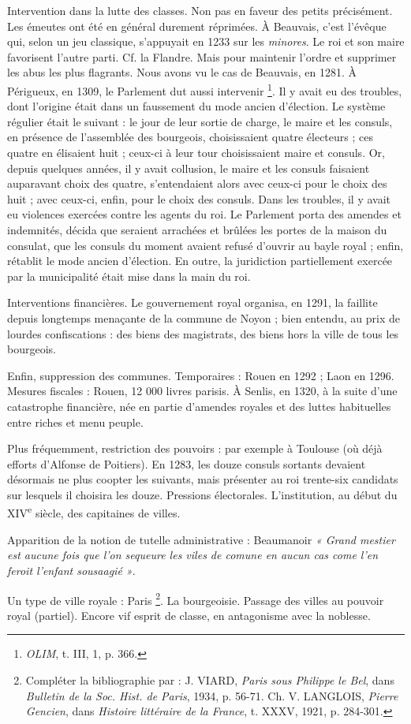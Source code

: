 \documentclass[french,twoside]{book} %
\begin{document}
Intervention dans la lutte des classes. Non pas en faveur des petits précisément. Les émeutes ont été en général durement répri­mées. À Beauvais, c’est l’évêque qui, selon un jeu classique, s’appuyait en 1233 sur les {\itshape minores}. Le roi et son maire favorisent l’autre parti. Cf. la Flandre. Mais pour maintenir l’ordre et suppri­mer les abus les plus flagrants. Nous avons vu le cas de Beauvais, en 1281. À Périgueux, en 1309, le Parlement dut aussi intervenir \footnote{{\itshape OLIM}, t. III, 1, p. 366.}. Il y avait eu des troubles, dont l’origine était dans un faussement du mode ancien d’élection. Le système régulier était le suivant : le jour de leur sortie de charge, le maire et les consuls, en présence de l’assemblée des bourgeois, choisissaient quatre électeurs ; ces quatre en élisaient huit ; ceux-ci à leur tour choisissaient maire et consuls. Or, depuis quelques années, il y avait collusion, le maire et les consuls faisaient auparavant choix des quatre, s’entendaient alors avec ceux-ci pour le choix des huit ; avec ceux-ci, enfin, pour le choix des consuls. Dans les troubles, il y avait eu violences exercées contre les agents du roi. Le Parlement porta des amendes et indemnités, décida que seraient arrachées et brûlées les portes de la maison du consulat, que les consuls du moment avaient refusé d’ouvrir au bayle royal ; enfin, rétablit le mode ancien d’élection. En outre, la juridiction partiellement exercée par la municipalité était mise dans la main du roi.\par
Interventions financières. Le gouvernement royal organisa, en 1291, la faillite depuis longtemps menaçante de la commune de Noyon ; bien entendu, au prix de lourdes confiscations : des biens des magistrats, des biens hors la ville de tous les bourgeois.\par
Enfin, suppression des communes. Temporaires : Rouen en 1292 ; Laon en 1296. Mesures fiscales : Rouen, 12 000 livres parisis. À Senlis, en 1320, à la suite d’une catastrophe financière, née en partie d’amendes royales et des luttes habituelles entre riches et menu peuple.\par
Plus fréquemment, restriction des pouvoirs : par exemple à Toulouse (où déjà efforts d’Alfonse de Poitiers). En 1283, les douze consuls sortants devaient désormais ne plus coopter les suivants,  
\label{p81} mais présenter au roi trente-six candidats sur lesquels il choisira les douze. Pressions électorales. L’institution, au début du XIV\textsuperscript{e} siècle, des capitaines de villes.\par
Apparition de la notion de tutelle administrative : Beaumanoir \emph{« Grand mestier est aucune fois que l’on sequeure les viles de comune en aucun cas come l’en feroit l’enfant sousaagié »}.\par
Un type de ville royale : Paris \footnote{ Compléter la bibliographie par : J. VIARD, {\itshape Paris sous Philippe le Bel}, dans {\itshape Bulletin de la Soc. Hist. de Paris}, 1934, p. 56-71. Ch. V. LANGLOIS, {\itshape Pierre Gencien}, dans {\itshape Histoire littéraire de la France}, t. XXXV, 1921, p. 284-301.}. La bourgeoisie. Passage des villes au pouvoir royal (partiel). Encore vif esprit de classe, en antagonisme avec la noblesse.\par
\end{document}
